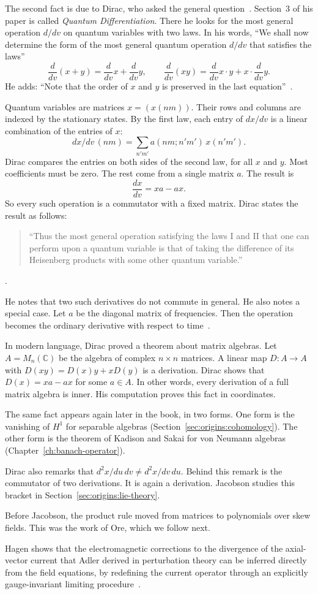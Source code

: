 The second fact is due to Dirac, who asked the general question~\cite{Dirac1925}. Section~3 of his paper
is called \emph{Quantum Differentiation}. There he looks for the most
general operation $d/dv$ on quantum variables with two laws. In his words,
``We shall now determine the form of the most general quantum operation
$d/dv$ that satisfies the laws''
\[
  \frac{d}{dv}(x+y) = \frac{d}{dv}x + \frac{d}{dv}y,
  \qquad
  \frac{d}{dv}(xy) = \frac{d}{dv}x \cdot y + x \cdot \frac{d}{dv}y .
\]
He adds: ``Note that the order of $x$ and $y$ is preserved in the last
equation''~\cite[\S 3, p.~645]{Dirac1925}.

Quantum variables are matrices $x = (x(nm))$. Their rows and columns are
indexed by the stationary states. By the first law, each entry of $dx/dv$
is a linear combination of the entries of $x$:
\[
  dx/dv\,(nm) = \sum_{n'm'} a(nm;n'm')\,x(n'm').
\]
Dirac compares the entries on both sides of the second law, for all $x$ and
$y$. Most coefficients must be zero. The rest come from a single matrix $a$.
The result is
\[
  \frac{dx}{dv} = xa - ax .
\]
So every such operation is a commutator with a fixed matrix. Dirac states
the result as follows:
\begin{quote}\small
``Thus the most general operation satisfying the laws I and II that one can
perform upon a quantum variable is that of taking the difference of its
Heisenberg products with some other quantum variable.''
\end{quote}
\noindent\cite[\S 3, pp.~646--647]{Dirac1925}.

He notes that two such derivatives do not commute in general. He also notes a
special case. Let $a$ be the diagonal matrix of frequencies. Then the
operation becomes the ordinary derivative with respect to
time~\cite[\S 3, p.~647]{Dirac1925}.

In modern language, Dirac proved a theorem about matrix algebras. Let $A = M_n(\mathbb{C})$ be the algebra of complex $n \times n$ matrices. A
linear map $D\colon A \to A$ with $D(xy) = D(x)y + xD(y)$ is a derivation.
Dirac shows that $D(x) = xa - ax$ for some $a \in A$. In other words, every
derivation of a full matrix algebra is inner. His computation proves this
fact in coordinates.

The same fact appears again later in the book, in two forms. One form is the
vanishing of $H^1$ for separable algebras
(Section~\ref{sec:origins:cohomology}). The other form is the theorem of
Kadison and Sakai for von Neumann algebras (Chapter~\ref{ch:banach-operator}).

Dirac also remarks that $d^2x/du\,dv \neq d^2x/dv\,du$. Behind this remark is
the commutator of two derivations. It is again a derivation. Jacobson studies
this bracket in Section~\ref{sec:origins:lie-theory}.

Before Jacobson, the product rule moved from matrices to polynomials over
skew fields. This was the work of Ore, which we follow next.

Hagen shows that the electromagnetic corrections to the divergence of the axial-vector current that Adler derived in perturbation theory can be inferred directly from the field equations, by redefining the current operator through an explicitly gauge-invariant limiting procedure~\cite{WlDerivationOfAdlersDivergenceCo1969}.
